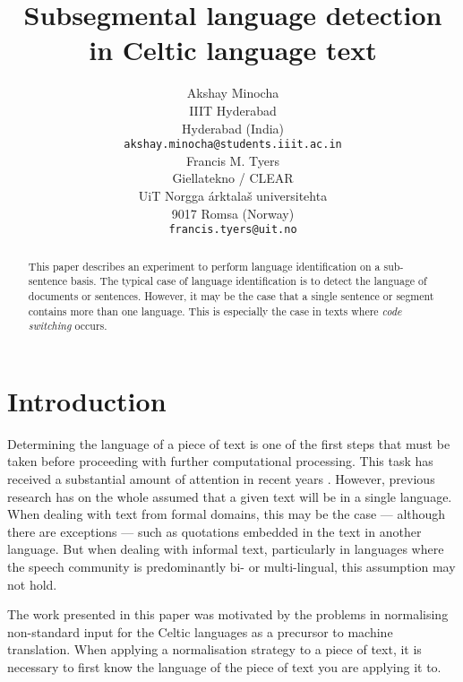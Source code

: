 \documentclass[11pt]{article}
\title{Subsegmental language detection in Celtic language text}
\author{}
\author{Akshay Minocha \\
  IIIT Hyderabad  \\
  Hyderabad (India) \\
  {\small {\tt akshay.minocha@students.iiit.ac.in}} \\\And
  Francis M. Tyers \\
  Giellatekno / CLEAR \\
  UiT Norgga \'arktala\v{s} universitehta  \\
  9017 Romsa (Norway) \\
  {\small {\tt francis.tyers@uit.no}} \\}
\date{}
\begin{document}
\maketitle
\begin{abstract}
  This paper describes an experiment to perform language identification on a sub-sentence basis. The typical
  case of language identification is to detect the language of documents or sentences. However, it may be the 
  case that a single sentence or segment contains more than one language. This is especially the case in texts
  where \emph{code switching} occurs. 

\end{abstract}

\section{Introduction}
\label{intro}
Determining the language of a piece of text is one of the first steps that must be taken
before proceeding with further computational processing. This task has received a substantial amount of
attention in recent years \cite{cavnar1994n,lui2012langid}. However, previous research has on the whole assumed
that a given text will be in a single language. When dealing with text from formal domains,
this may be the case --- although there are exceptions --- such as quotations embedded in
the text in another language. But when dealing with informal text, particularly in languages
where the speech community is predominantly bi- or multi-lingual, this assumption may not hold.

The work presented in this paper was motivated by the problems in normalising non-standard input
for the Celtic languages as a precursor to machine translation. When applying a normalisation 
strategy to a piece of text, it is necessary to first know the language of the piece of text you 
are applying it to.
\end{document}
